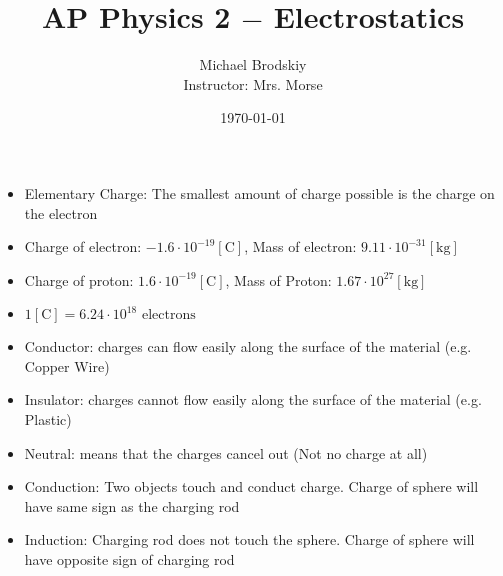 \documentclass[12pt]{article}
\title{AP Physics 2 $-$ Electrostatics}
\date{\today}
\author{Michael Brodskiy\\ \small Instructor: Mrs. Morse}
\begin{document}
\maketitle

\begin{itemize}

  \item Elementary Charge: The smallest amount of charge possible is the charge on the electron

  \item Charge of electron: $-1.6\cdot10^{-19}[\si{\coulomb}]$, Mass of electron: $9.11\cdot10^{-31}[\si{\kilo\gram}]$

  \item Charge of proton: $1.6\cdot10^{-19}[\si{\coulomb}]$, Mass of Proton: $1.67\cdot10^{27}[\si{\kilo\gram}]$

  \item $1[\si{\coulomb}]=6.24\cdot10^{18}\text{ electrons}$

  \item Conductor: charges can flow easily along the surface of the material (e.g. Copper Wire)

  \item Insulator: charges cannot flow easily along the surface of the material (e.g. Plastic)

  \item Neutral: means that the charges cancel out (Not no charge at all)

  \item Conduction: Two objects touch and conduct charge. Charge of sphere will have same sign as the charging rod

  \item Induction: Charging rod does not touch the sphere. Charge of sphere will have opposite sign of charging rod

\end{itemize}
\end{document}
